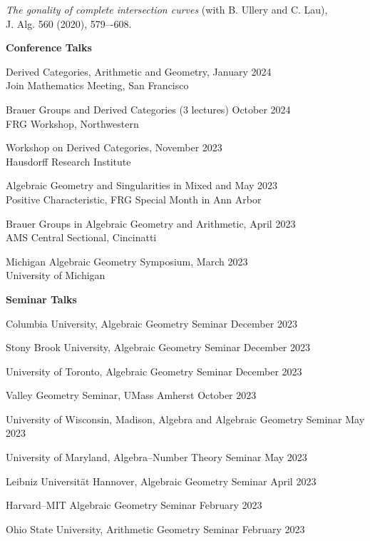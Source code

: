 \documentclass[11 pt]{letter}
\begin{document}
	\emph{The gonality of complete intersection curves} (with B. Ullery and C. Lau), \\
	\indent J. Alg. 560 (2020), 579–-608.


	\medskip
	\noindent
	\textbf{\large{Conference Talks}}


	Derived Categories, Arithmetic and Geometry, \hfill January 2024 \\
	\indent Join Mathematics Meeting, San Francisco

	Brauer Groups and Derived Categories (3 lectures) \hfill October 2024 \\
	\indent FRG Workshop, Northwestern

	
	Workshop on Derived Categories, \hfill November 2023 \\
	\indent Hausdorff Research Institute

	Algebraic Geometry and Singularities in Mixed and \hfill May 2023 \\
	\indent Positive Characteristic, FRG Special Month in Ann Arbor 


	Brauer Groups in Algebraic Geometry and Arithmetic, \hfill April 2023 \\
	\indent AMS Central Sectional, Cincinatti 


	Michigan Algebraic Geometry Symposium, \hfill March 2023 \\
	\indent University of Michigan


	\medskip
	\noindent
	\textbf{\large{Seminar Talks}}

	Columbia University, Algebraic Geometry Seminar \hfill December 2023

	Stony Brook University, Algebraic Geometry Seminar \hfill December 2023

	University of Toronto, Algebraic Geometry Seminar \hfill December 2023

	Valley Geometry Seminar, UMass Amherst \hfill October 2023

	University of Wisconsin, Madison, Algebra and Algebraic Geometry Seminar \hfill May 2023

	University of Maryland, Algebra--Number Theory Seminar \hfill May 2023

	Leibniz Universit\"at Hannover, Algebraic Geometry Seminar \hfill April 2023

	Harvard--MIT Algebraic Geometry Seminar \hfill February 2023

	Ohio State University, Arithmetic Geometry Seminar \hfill February 2023
\end{document}
